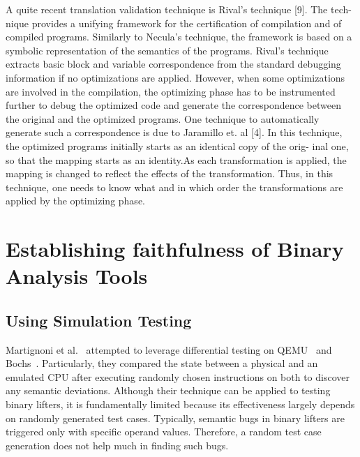 A quite recent translation validation technique is Rival’s technique [9]. The
tech- nique provides a unifying framework for the certification of compilation
and of compiled programs. Similarly to Necula’s technique, the framework is
based on a symbolic representation of the semantics of the programs. Rival’s
technique extracts basic block and variable correspondence from the standard
debugging information if no optimizations are applied. However, when some
optimizations are involved in the compilation, the optimizing phase has to be
instrumented further to debug the optimized code and generate the
correspondence between the original and the optimized programs. One technique
to automatically generate such a correspondence is due to Jaramillo et. al [4].
In this technique, the optimized programs initially starts as an identical copy
of the orig- inal one, so that the mapping starts as an identity.As each
transformation is applied, the mapping is changed to reflect the effects of the
transformation. Thus, in this technique, one needs to know what and in which
order the transformations are applied by the optimizing phase.  

\section{Establishing faithfulness of Binary Analysis Tools}

\subsection{Using Simulation Testing}

Martignoni et al.~\cite{Martignoni:ISSTA2009, Martignoni:ISSTA2010} attempted
to leverage differential testing on QEMU~\cite{QEMU:USENIX05} and
Bochs~\cite{Bochs1996}. Particularly, they compared the state between a
physical and an emulated CPU after executing randomly chosen instructions on
both to discover any semantic deviations. Although their technique can be
applied to testing binary lifters, it is fundamentally limited because its
effectiveness largely depends on randomly generated test cases. Typically,
              semantic bugs in binary lifters are triggered only with specific
              operand values. Therefore, a random test case generation does not
              help much in finding such bugs.

